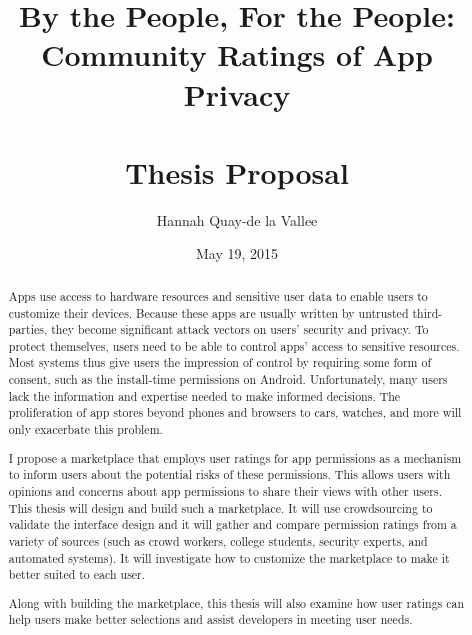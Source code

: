 \documentclass[11pt]{article}
\begin{document}
\author{Hannah Quay-de la Vallee}
\title{By the People, For the People: \\ Community Ratings of App Privacy \\ \ \\ Thesis Proposal}
\date{May 19, 2015}

\maketitle

\maketitle %

\newpage

\tableofcontents %

\newpage

\doublespacing


\setcounter{page}{1}
\pagestyle{empty}
\hypersetup{pageanchor=false}


\pagestyle{plain}

\begin{abstract}

Apps use access to hardware resources and sensitive 
user data to enable users to customize their devices. 
Because these apps are usually written by untrusted 
third-parties, they become significant attack vectors 
on users' security and privacy. To protect themselves, 
users need to be able to control apps' access to 
sensitive resources. Most systems thus give users 
the impression of control by requiring some form of 
consent, such as the install-time permissions on Android. 
Unfortunately, many users lack the 
information and expertise needed to make informed 
decisions. The proliferation of app stores beyond 
phones and browsers to cars, watches, and more will 
only exacerbate this problem. 

I propose a marketplace that employs user ratings for 
app permissions as a mechanism to inform users about 
the potential risks of these permissions. This allows 
users with opinions and concerns about app permissions 
to share their views with other users. This thesis will 
design and build such a marketplace. It will use 
crowdsourcing to validate the interface design and it will
gather and compare permission ratings from a variety of 
sources (such as crowd workers, college students, security 
experts, and automated systems). It will investigate how to customize 
the marketplace to make it better suited to each user. 

Along with building the marketplace, this thesis will 
also examine how user ratings can help users make better 
selections and assist developers in meeting user needs.

\end{abstract}
\end{document}
